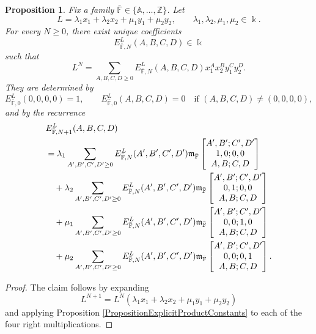 \documentclass{amsart}
\newtheorem{proposition}[theorem]{Proposition}
\theoremstyle{definition}
\theoremstyle{remark}
\numberwithin{equation}{section}
\begin{document}
\begin{proposition}\label{PropositionExplicitPolynomialPowers}
Fix a family $\bar{\mathbb{F}}\in\{\mathbb{A},\ldots,\mathbb{Z}\}$. Let
\[
L=
\lambda_1x_1+\lambda_2x_2+\mu_1y_1+\mu_2y_2,
\qquad
\lambda_1,\lambda_2,\mu_1,\mu_2\in\Bbbk.
\]
For every $N\ge0$, there exist unique coefficients
\[
E_{\bar{\mathbb{F}},N}^{L}(A,B,C,D)\in\Bbbk
\]
such that
\[
L^N
=
\sum_{A,B,C,D\ge0}
E_{\bar{\mathbb{F}},N}^{L}(A,B,C,D)
x_1^Ax_2^By_1^Cy_2^D.
\]
They are determined by
\[
E_{\bar{\mathbb{F}},0}^{L}(0,0,0,0)=1,
\qquad
E_{\bar{\mathbb{F}},0}^{L}(A,B,C,D)=0
\quad\text{if }(A,B,C,D)\neq(0,0,0,0),
\]
and by the recurrence
\begin{align}
&E_{\bar{\mathbb{F}},N+1}^{L}(A,B,C,D)
\notag\\
&=
\lambda_1
\sum_{A',B',C',D'\ge0}
E_{\bar{\mathbb{F}},N}^{L}(A',B',C',D')
\mathfrak{m}_{\bar{\mathbb{F}}}
\begin{bmatrix}
A',B';C',D'\\
1,0;0,0\\
A,B;C,D
\end{bmatrix}
\notag\\
&\quad+
\lambda_2
\sum_{A',B',C',D'\ge0}
E_{\bar{\mathbb{F}},N}^{L}(A',B',C',D')
\mathfrak{m}_{\bar{\mathbb{F}}}
\begin{bmatrix}
A',B';C',D'\\
0,1;0,0\\
A,B;C,D
\end{bmatrix}
\notag\\
&\quad+
\mu_1
\sum_{A',B',C',D'\ge0}
E_{\bar{\mathbb{F}},N}^{L}(A',B',C',D')
\mathfrak{m}_{\bar{\mathbb{F}}}
\begin{bmatrix}
A',B';C',D'\\
0,0;1,0\\
A,B;C,D
\end{bmatrix}
\notag\\
&\quad+
\mu_2
\sum_{A',B',C',D'\ge0}
E_{\bar{\mathbb{F}},N}^{L}(A',B',C',D')
\mathfrak{m}_{\bar{\mathbb{F}}}
\begin{bmatrix}
A',B';C',D'\\
0,0;0,1\\
A,B;C,D
\end{bmatrix}.
\label{EquationExplicitLinearPowerRecursion}
\end{align}
\end{proposition}

\begin{proof}
The claim follows by expanding
\[
L^{N+1}=L^N(\lambda_1x_1+\lambda_2x_2+\mu_1y_1+\mu_2y_2)
\]
and applying Proposition \ref{PropositionExplicitProductConstants} to each of the four right multiplications.
\end{proof}
\end{document}
